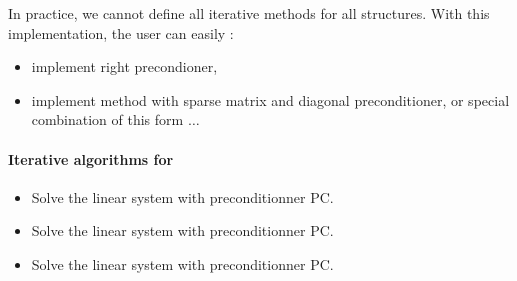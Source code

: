 In practice, we cannot define all iterative methods for all structures.
With this implementation, the user can easily :
\begin{itemize}
\item implement right precondioner, 
\item implement method with sparse matrix and diagonal preconditioner, or
  special combination of this form $\dots$
\end{itemize}


\paragraph{Iterative algorithms for \PnlMat}


\begin{itemize}
\item {}
  \sshortdescribe Solve the linear system  with preconditionner PC.  
\item {}
  \sshortdescribe Solve the linear system  with preconditionner PC.  
\item {}
  \sshortdescribe Solve the linear system  with preconditionner PC.
\end{itemize}

